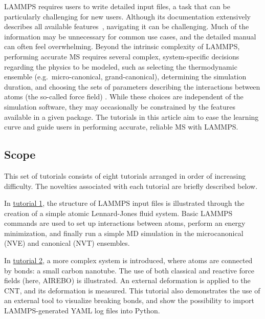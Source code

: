\documentclass[9pt,tutorial]{livecoms}
\begin{document}
LAMMPS requires users to write detailed input files, a task that
can be particularly challenging for new users.  Although its
documentation extensively describes all available features~\cite{lammps_docs},
navigating it can be challenging.  Much of the information may be
unnecessary for common use cases, and the detailed manual can
often feel overwhelming.  Beyond the intrinsic complexity of LAMMPS, performing accurate
MS requires several complex, system-specific decisions regarding
the physics to be modeled, such as selecting the thermodynamic
ensemble (e.g.~micro-canonical, grand-canonical), determining the
simulation duration, and choosing the sets of parameters describing the
interactions between atoms (the so-called force field)
\cite{wong2016good, van2018validation, prasad2018best}.  While these choices are independent of the
simulation software, they may occasionally be constrained by the
features available in a given package.  The tutorials in this
article aim to ease the learning curve and guide users in
performing accurate, reliable MS with LAMMPS.

\subsection{Scope}

This set of tutorials consists of eight tutorials arranged in order of
increasing difficulty.  The novelties associated with each tutorial are
briefly described below.

In \hyperref[lennard-jones-label]{tutorial 1}, the structure of LAMMPS
input files is illustrated through the creation of a simple atomic
Lennard-Jones fluid system.  Basic LAMMPS commands are used to set up
interactions between atoms, perform an energy minimization, and finally
run a simple MD simulation in the microcanonical (NVE) and canonical (NVT)
ensembles.

In \hyperref[carbon-nanotube-label]{tutorial 2}, a more complex system
is introduced, where atoms are connected by bonds: a small carbon
nanotube.  The use of both classical and reactive force fields (here,
AIREBO) is illustrated.  An external deformation is applied to the CNT,
and its deformation is measured.  This tutorial also demonstrates the use
of an external tool to visualize breaking bonds, and show the possibility
to import LAMMPS-generated YAML log files into Python. %
\end{document}

